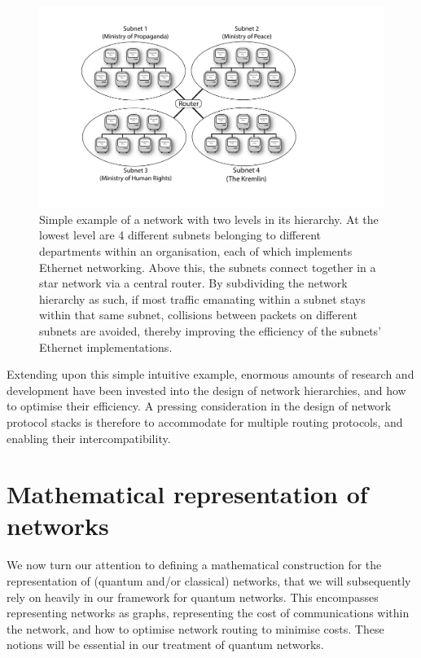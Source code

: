 \documentclass[aps, rmp, twocolumn, amsmath, amssymb, nofootinbib, superscriptaddress, longbibliography, floatfix, table-of-contents, eqsecnum]{revtex4-1}
\begin{document}
\begin{figure}[!htb]
	\includegraphics[width=\columnwidth]{network_hierarchy}
	\caption{Simple example of a network with two levels in its hierarchy. At the lowest level are 4 different subnets belonging to different departments within an organisation, each of which implements Ethernet networking. Above this, the subnets connect together in a star network via a central router. By subdividing the network hierarchy as such, if most traffic emanating within a subnet stays within that same subnet, collisions between packets on different subnets are avoided, thereby improving the efficiency of the subnets' Ethernet implementations.} \label{fig:net_hierarchy}
\end{figure}

Extending upon this simple intuitive example, enormous amounts of research and development have been invested into the design of network hierarchies, and how to optimise their efficiency. A pressing consideration in the design of network protocol stacks is therefore to accommodate for multiple routing protocols, and enabling their intercompatibility.

%
%

\section{Mathematical representation of networks}

We now turn our attention to defining a mathematical construction for the representation of (quantum and/or classical) networks, that we will subsequently rely on heavily in our framework for quantum networks. This encompasses representing networks as graphs, representing the cost of communications within the network, and how to optimise network routing to minimise costs.  These notions will be essential in our treatment of quantum networks.
\end{document}
